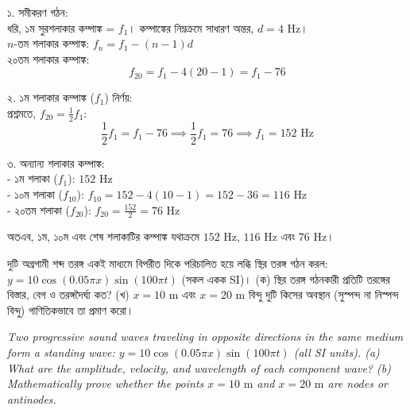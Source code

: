 \documentclass[12pt, a4paper]{article}
\begin{document}
\vspace{1em}

\begin{tcolorbox}[solutionbox={সমাধান (Solution)}]
\noindent
১. সমীকরণ গঠন: \\
ধরি, ১ম সুরশলাকার কম্পাঙ্ক = $f_1$। কম্পাঙ্কের নিম্নক্রমে সাধারণ অন্তর, $d = 4\text{ Hz}$। \\
$n$-তম শলাকার কম্পাঙ্ক: $f_n = f_1 - (n - 1) d$ \\
২০তম শলাকার কম্পাঙ্ক:
\[ f_{20} = f_1 - 4(20 - 1) = f_1 - 76 \]

\noindent
২. ১ম শলাকার কম্পাঙ্ক ($f_1$) নির্ণয়: \\
প্রশ্নমতে, $f_{20} = \frac{1}{2} f_1$:
\[ \frac{1}{2} f_1 = f_1 - 76 \implies \frac{1}{2} f_1 = 76 \implies f_1 = 152\text{ Hz} \]

\noindent
৩. অন্যান্য শলাকার কম্পাঙ্ক: \\
- ১ম শলাকা ($f_1$): $152\text{ Hz}$ \\
- ১০ম শলাকা ($f_{10}$): $f_{10} = 152 - 4(10 - 1) = 152 - 36 = 116\text{ Hz}$ \\
- ২০তম শলাকা ($f_{20}$): $f_{20} = \frac{152}{2} = 76\text{ Hz}$

\vspace{0.5em}
\noindent
অতএব, ১ম, ১০ম এবং শেষ শলাকাটির কম্পাঙ্ক যথাক্রমে $152\text{ Hz}$, $116\text{ Hz}$ এবং $76\text{ Hz}$।
\end{tcolorbox}

\vspace{1.5em}

\begin{tcolorbox}[questionbox={প্রশ্ন (Question) 4}]
\noindent
দুটি অগ্রগামী শব্দ তরঙ্গ একই মাধ্যমে বিপরীত দিকে পরিচালিত হয়ে লব্ধি স্থির তরঙ্গ গঠন করল: $y = 10 \cos(0.05\pi x) \sin(100\pi t)$ (সকল একক SI)। (ক) স্থির তরঙ্গ গঠনকারী প্রতিটি তরঙ্গের বিস্তার, বেগ ও তরঙ্গদৈর্ঘ্য কত? (খ) $x = 10\text{ m}$ এবং $x = 20\text{ m}$ বিন্দু দুটি কিসের অবস্থান (সুস্পন্দ না নিস্পন্দ বিন্দু) গাণিতিকভাবে তা প্রমাণ করো।

\vspace{0.8em}
\begin{english}
\noindent\textit{\color{darkgray}
Two progressive sound waves traveling in opposite directions in the same medium form a standing wave: $y = 10 \cos(0.05\pi x) \sin(100\pi t)$ (all SI units). (a) What are the amplitude, velocity, and wavelength of each component wave? (b) Mathematically prove whether the points $x = 10\text{ m}$ and $x = 20\text{ m}$ are nodes or antinodes.
}
\end{english}
\end{tcolorbox}
\end{document}
